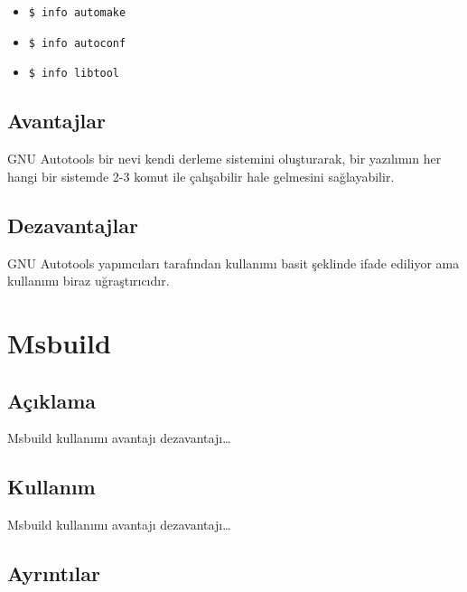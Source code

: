 \documentclass[
]{book}
\providecommand{\tightlist}{%
  \setlength{\itemsep}{0pt}\setlength{\parskip}{0pt}}
\begin{document}
\begin{itemize}
  \begin{itemize}
  \tightlist
  \item
    \texttt{\$\ info\ automake}
  \item
    \texttt{\$\ info\ autoconf}
  \item
    \texttt{\$\ info\ libtool}
  \end{itemize}
\end{itemize}

\hypertarget{avantajlar-2}{%
\section*{Avantajlar}\label{avantajlar-2}}

GNU Autotools bir nevi kendi derleme sistemini oluşturarak, bir yazılımın her hangi bir sistemde 2-3 komut ile çalışabilir hale gelmesini sağlayabilir.

\hypertarget{dezavantajlar-2}{%
\section*{Dezavantajlar}\label{dezavantajlar-2}}

GNU Autotools yapımcıları tarafından kullanımı basit şeklinde ifade ediliyor ama kullanımı biraz uğraştırıcıdır.

\hypertarget{msbuild}{%
\chapter*{Msbuild}\label{msbuild}}

\hypertarget{auxe7ux131klama-4}{%
\section*{Açıklama}\label{auxe7ux131klama-4}}

Msbuild kullanımı avantajı dezavantajı\ldots{}

\hypertarget{kullanux131m-3}{%
\section*{Kullanım}\label{kullanux131m-3}}

Msbuild kullanımı avantajı dezavantajı\ldots{}

\hypertarget{ayrux131ntux131lar-3}{%
\section*{Ayrıntılar}\label{ayrux131ntux131lar-3}}
\end{document}
